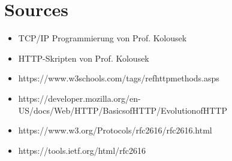 \documentclass{article}
\begin{document}
\section{Sources}
\begin{itemize}
  \item TCP/IP Programmierung von Prof. Kolousek
  \item HTTP-Skripten von Prof. Kolousek
  \item https://www.w3schools.com/tags/ref\textunderscore httpmethods.asps
  \item https://developer.mozilla.org/en-US/docs/Web/HTTP/Basics\textunderscore of\textunderscore HTTP/Evolution\textunderscore of\textunderscore HTTP
  \item https://www.w3.org/Protocols/rfc2616/rfc2616.html
  \item https://tools.ietf.org/html/rfc2616
\end{itemize}
\end{document}
